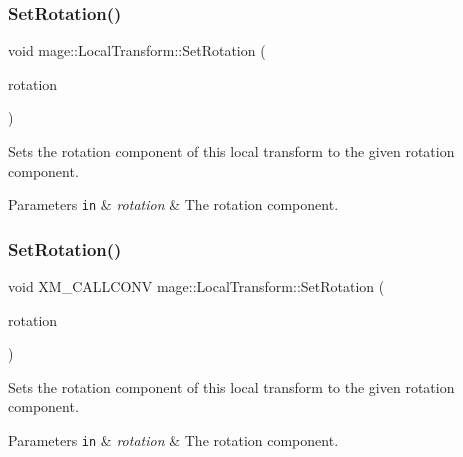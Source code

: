 \subsubsection{\texorpdfstring{Set\+Rotation()}{SetRotation()}\hspace{0.1cm}{\footnotesize\ttfamily [2/3]}}
{\footnotesize\ttfamily void mage\+::\+Local\+Transform\+::\+Set\+Rotation (\begin{DoxyParamCaption}\item[{\mbox{\hyperlink{namespacemage_a1e3c7a882af461f161caa1cbddaf1fa2}{F32x3}}}]{rotation }\end{DoxyParamCaption})\hspace{0.3cm}{\ttfamily [noexcept]}}

Sets the rotation component of this local transform to the given rotation component.


\begin{DoxyParams}[1]{Parameters}
\mbox{\tt in}  & {\em rotation} & The rotation component. \\
\hline
\end{DoxyParams}
\mbox{\label{classmage_1_1_local_transform_a470961f6e4f3b0920742489722ca791e}} 
\subsubsection{\texorpdfstring{Set\+Rotation()}{SetRotation()}\hspace{0.1cm}{\footnotesize\ttfamily [3/3]}}
{\footnotesize\ttfamily void X\+M\+\_\+\+C\+A\+L\+L\+C\+O\+NV mage\+::\+Local\+Transform\+::\+Set\+Rotation (\begin{DoxyParamCaption}\item[{F\+X\+M\+V\+E\+C\+T\+OR}]{rotation }\end{DoxyParamCaption})\hspace{0.3cm}{\ttfamily [noexcept]}}

Sets the rotation component of this local transform to the given rotation component.


\begin{DoxyParams}[1]{Parameters}
\mbox{\tt in}  & {\em rotation} & The rotation component. \\
\hline
\end{DoxyParams}
\mbox{\label{classmage_1_1_local_transform_a366b1cbd069bce035a868a8800dc04e9}} 
